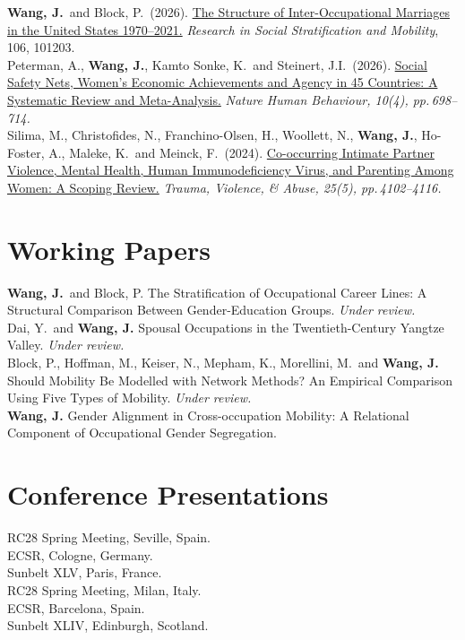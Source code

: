 \documentclass[11pt,a4paper]{article}
\newcommand{\yr}[1]{\makebox[3em][l]{\textbf{#1}}}
\begin{document}
\textbf{Wang, J.}\ and Block, P.\ (2026). \href{https://doi.org/10.1016/j.rssm.2026.101203}{The Structure of Inter-Occupational Marriages in the United States 1970--2021.} \textit{Research in Social Stratification and Mobility}, 106, 101203.\\[0.45em]
Peterman, A., \textbf{Wang, J.}, Kamto Sonke, K.\ and Steinert, J.I.\ (2026). \href{https://www.nature.com/articles/s41562-025-02394-0}{Social Safety Nets, Women's Economic Achievements and Agency in 45 Countries: A Systematic Review and Meta-Analysis.} \textit{Nature Human Behaviour, 10(4), pp.\,698--714.}\\[0.45em]
Silima, M., Christofides, N., Franchino-Olsen, H., Woollett, N., \textbf{Wang, J.}, Ho-Foster, A., Maleke, K.\ and Meinck, F.\ (2024). \href{https://journals.sagepub.com/doi/full/10.1177/15248380241268807}{Co-occurring Intimate Partner Violence, Mental Health, Human Immunodeficiency Virus, and Parenting Among Women: A Scoping Review.} \textit{Trauma, Violence, \& Abuse, 25(5), pp.\,4102--4116.}

\section{Working Papers}

\textbf{Wang, J.}\ and Block, P. The Stratification of Occupational Career Lines: A Structural Comparison Between Gender-Education Groups. \textit{Under review.}\\[0.3em]
Dai, Y.\ and \textbf{Wang, J.} Spousal Occupations in the Twentieth-Century Yangtze Valley. \textit{Under review.}\\[0.3em]
Block, P., Hoffman, M., Keiser, N., Mepham, K., Morellini, M.\ and \textbf{Wang, J.} Should Mobility Be Modelled with Network Methods? An Empirical Comparison Using Five Types of Mobility. \textit{Under review.}\\[0.3em]
\textbf{Wang, J.} Gender Alignment in Cross-occupation Mobility: A Relational Component of Occupational Gender Segregation.

\section{Conference Presentations}

\yr{2026}RC28 Spring Meeting, Seville, Spain.\\[0.4em]
\yr{2025}ECSR, Cologne, Germany.\\
\yr{}Sunbelt XLV, Paris, France.\\
\yr{}RC28 Spring Meeting, Milan, Italy.\\[0.4em]
\yr{2024}ECSR, Barcelona, Spain.\\
\yr{}Sunbelt XLIV, Edinburgh, Scotland.
\end{document}

